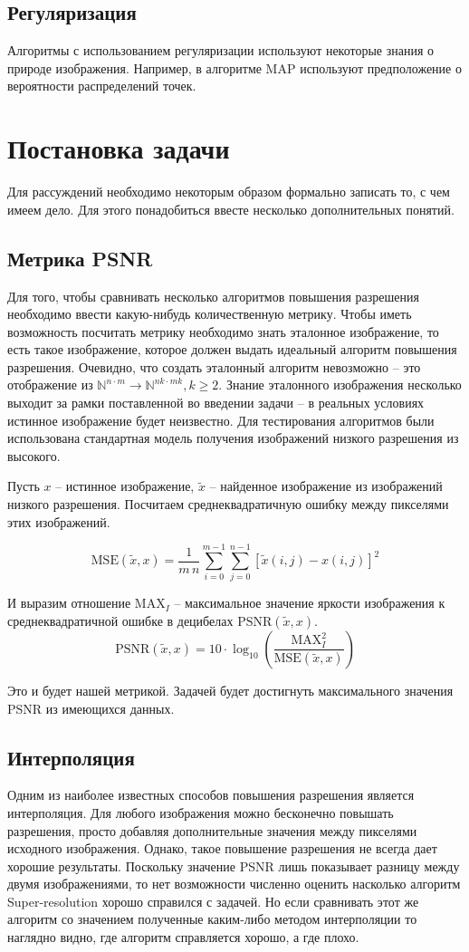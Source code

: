\subsection{Регуляризация} Алгоритмы с использованием регуляризации используют некоторые знания о природе изображения.
Например, в алгоритме MAP используют предположение о вероятности распределений точек.

\section{Постановка задачи}
Для рассуждений необходимо некоторым образом формально записать то, с чем имеем дело. Для этого понадобиться ввесте
несколько дополнительных понятий.

\subsection{Метрика PSNR}
Для того, чтобы сравнивать несколько алгоритмов повышения разрешения необходимо ввести какую-нибудь количественную
метрику. Чтобы иметь возможность посчитать метрику необходимо знать эталонное изображение, то есть такое изображение,
которое должен выдать идеальный алгоритм повышения разрешения. Очевидно, что создать эталонный алгоритм невозможно --
это отображение из $\mathbb{N}^{n \cdot m } \to \mathbb{N}^{nk \cdot mk}, k \ge 2$. Знание эталонного изображения
несколько выходит за рамки поставленной во введении задачи -- в реальных условиях истинное изображение будет неизвестно.
Для тестирования алгоритмов были использована стандартная модель получения изображений низкого разрешения из высокого.

Пусть $x$ -- истинное изображение, $\tilde{x}$ -- найденное изображение из изображений низкого разрешения. Посчитаем
среднеквадратичную ошибку между пикселями этих изображений.

$$ \mathrm{MSE}(\tilde{x},x) = \frac{1}{m\,n}\sum_{i=0}^{m-1}\sum_{j=0}^{n-1} [\tilde{x}(i,j) - x(i,j)]^2$$

И выразим отношение $\mathrm{MAX}_I$ -- максимальное значение яркости изображения к среднеквадратичной ошибке в
децибелах
$\mathrm{PSNR}(\tilde{x},x)$.
$$ \mathrm{PSNR}(\tilde{x},x) = 10 \cdot \log_{10} \left( \frac{\mathrm{MAX}_I^2}{\mathrm{MSE}(\tilde{x},x)} \right) $$

Это и будет нашей метрикой. Задачей будет достигнуть максимального значения PSNR из имеющихся данных.

\subsection{Интерполяция}
Одним из наиболее известных способов повышения разрешения является интерполяция. Для любого изображения можно бесконечно
повышать разрешения, просто добавляя дополнительные значения между пикселями исходного изображения. Однако, такое
повышение разрешения не всегда дает хорошие результаты. Поскольку значение PSNR лишь показывает разницу между двумя
изображениями, то нет возможности численно оценить насколько алгоритм Super-resolution хорошо справился с задачей. Но
если сравнивать этот же алгоритм со значением полученные каким-либо методом интерполяции то наглядно видно, где алгоритм
справляется хорошо, а где плохо.

